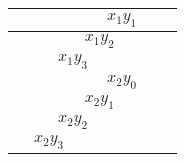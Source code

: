 \begin{center}
\begin{tabular}{|c|c|c|c|c|c|c|c|}
\hspace{15pt} & \hspace{15pt} & \hspace{15pt} & \hspace{15pt} & \multicolumn{2}{c|}{$x_1y_1$} & \hspace{15pt} & \hspace{15pt} \\ \hline
\hspace{15pt} & \hspace{15pt} & \hspace{15pt} & \multicolumn{2}{c|}{$x_1y_2$} & \hspace{15pt} & \hspace{15pt} & \hspace{15pt} \\ \hline
\hspace{15pt} & \hspace{15pt} & \multicolumn{2}{c|}{$x_1y_3$} & \hspace{15pt} & \hspace{15pt} & \hspace{15pt} & \hspace{15pt} \\ \hline\hline
\hspace{15pt} & \hspace{15pt} & \hspace{15pt} & \hspace{15pt} & \multicolumn{2}{c|}{$x_2y_0$} & \hspace{15pt} & \hspace{15pt} \\ \hline
\hspace{15pt} & \hspace{15pt} & \hspace{15pt} & \multicolumn{2}{c|}{$x_2y_1$} & \hspace{15pt} & \hspace{15pt} & \hspace{15pt} \\ \hline
\hspace{15pt} & \hspace{15pt} & \multicolumn{2}{c|}{$x_2y_2$} & \hspace{15pt} & \hspace{15pt} & \hspace{15pt} & \hspace{15pt} \\ \hline
\hspace{15pt} & \multicolumn{2}{c|}{$x_2y_3$} & \hspace{15pt} & \hspace{15pt} & \hspace{15pt} & \hspace{15pt} & \hspace{15pt} \\ \hline\hline

\end{tabular}
\end{center}
